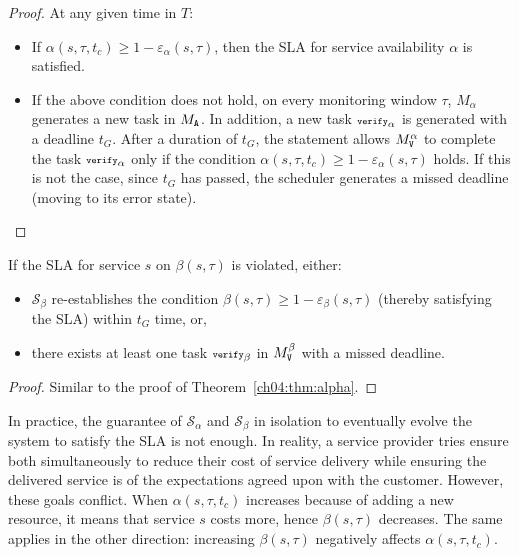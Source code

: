 \begin{proof}
At any given time in $T$:
\begin{itemize}
\item If $\alpha(s,\tau,t_c) \geq 1-\varepsilon_\alpha(s,\tau)$, then the SLA for service availability $\alpha$ is satisfied. 
\item If the above condition does not hold, on every monitoring window $\tau$, $M_\alpha$ generates a new task  in $M_{{\scriptsize\texttt{A}}}$. 
In addition, a new task ${\scriptsize\texttt{verify}}_{\alpha}$ is generated with a deadline $t_G$. 
After a duration of $t_G$, the  statement allows $M^{\alpha}_{{\scriptsize\texttt{V}}}$ to complete the task ${\scriptsize\texttt{verify}}_\alpha$ only if the condition $\alpha(s,\tau,t_c) \geq 1-\varepsilon_\alpha(s,\tau)$ holds.
If this is not the case, since $t_G$ has passed, the scheduler generates a missed deadline (moving to its error state). 
\end{itemize}
\end{proof}

\begin{thm}
\label{ch04:thm:beta}
If the SLA for service $s$ on $\beta(s,\tau)$ is violated, either:
\begin{itemize}
\item $\mathcal{S}_\beta$ re-establishes the condition $\beta(s,\tau) \geq 1-\varepsilon_\beta(s,\tau)$ (thereby satisfying the SLA) within $t_G$ time, or,
\item there exists at least one task ${\scriptsize\texttt{verify}}_\beta$ in $M^{\beta}_{{\scriptsize\texttt{V}}}$ with a missed deadline. 
\end{itemize}
\end{thm}

\begin{proof}
Similar to the proof of Theorem~\ref{ch04:thm:alpha}.
\end{proof}

In practice, the guarantee of $\mathcal{S}_\alpha$ and $\mathcal{S}_\beta$
in isolation to eventually evolve the system to satisfy the SLA is not enough.
In reality, a service provider tries ensure both simultaneously to reduce their cost of service delivery while ensuring the delivered service is of the expectations agreed upon with the customer.
However, these goals conflict.
When $\alpha(s,\tau,t_c)$ increases because of adding a new resource,
it means that service $s$ costs more, hence $\beta(s,\tau)$ decreases.
The same applies in the other direction: increasing $\beta(s,\tau)$
negatively affects $\alpha(s,\tau,t_c)$.

